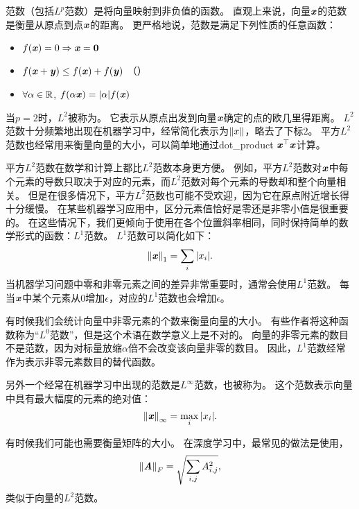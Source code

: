 

范数（包括$L^p$范数）是将向量映射到非负值的函数。
直观上来说，向量$\boldsymbol{\mathit{x}}$的范数是衡量从原点到点$\boldsymbol{\mathit{x}}$的距离。
更严格地说，范数是满足下列性质的任意函数：
\begin{itemize}
\item $f(\boldsymbol{\mathit{x}}) = 0 \Rightarrow \boldsymbol{\mathit{x}} = \mathbf{0}$ 
\item $f(\boldsymbol{\mathit{x}} + \boldsymbol{\mathit{y}}) \leq f(\boldsymbol{\mathit{x}}) + f(\boldsymbol{\mathit{y}})$ （）
\item $\forall \alpha \in \mathbb{R}$, $f(\alpha \boldsymbol{\mathit{x}}) = |\alpha| f(\boldsymbol{\mathit{x}})$
\end{itemize}


当$p=2$时，$L^2$被称为。
它表示从原点出发到向量$\boldsymbol{\mathit{x}}$确定的点的欧几里得距离。
$L^2$范数十分频繁地出现在机器学习中，经常简化表示为$\left\lVert x\right\rVert$，略去了下标$2$。
平方$L^2$范数也经常用来衡量向量的大小，可以简单地通过\gls{dot_product} $\boldsymbol{\mathit{x}}^\top\boldsymbol{\mathit{x}}$计算。


平方$L^2$范数在数学和计算上都比$L^2$范数本身更方便。
例如，平方$L^2$范数对$\boldsymbol{\mathit{x}}$中每个元素的导数只取决于对应的元素，而$L^2$范数对每个元素的导数却和整个向量相关。
但是在很多情况下，平方$L^2$范数也可能不受欢迎，因为它在原点附近增长得十分缓慢。
在某些机器学习应用中，区分元素值恰好是零还是非零小值是很重要的。
在这些情况下，我们更倾向于使用在各个位置斜率相同，同时保持简单的数学形式的函数：$L^1$范数。
$L^1$范数可以简化如下：
\begin{equation}
    \left\lVert\boldsymbol{\mathit{x}}\right\rVert_1 = \sum_i  |x_i|.
\end{equation}
当机器学习问题中零和非零元素之间的差异非常重要时，通常会使用$L^1$范数。
每当$\boldsymbol{\mathit{x}}$中某个元素从$0$增加$\epsilon$，对应的$L^1$范数也会增加$\epsilon$。


有时候我们会统计向量中非零元素的个数来衡量向量的大小。
有些作者将这种函数称为``$L^0$范数''，但是这个术语在数学意义上是不对的。
向量的非零元素的数目不是范数，因为对标量放缩$\alpha$倍不会改变该向量非零的数目。
因此，$L^1$范数经常作为表示非零元素数目的替代函数。





另外一个经常在机器学习中出现的范数是$L^\infty$范数，也被称为。
这个范数表示向量中具有最大幅度的元素的绝对值：
\begin{equation}
    \left\lVert\boldsymbol{\mathit{x}}\right\rVert_\infty = \max_i |x_i|.
\end{equation}


有时候我们可能也需要衡量矩阵的大小。
在深度学习中，最常见的做法是使用，
\begin{equation}
    \left\lVert\boldsymbol{\mathit{A}}\right\rVert_F = \sqrt{\sum_{i,j} A_{i,j}^2}, 
\end{equation}
类似于向量的$L^2$范数。



